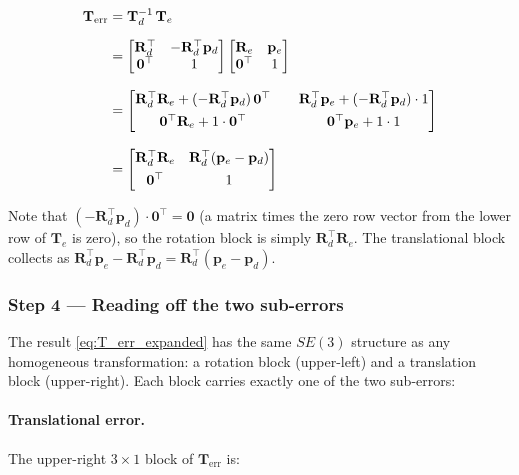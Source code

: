 \begin{align}
\mathbf{T}_{\mathrm{err}}
&= \mathbf{T}_d^{-1}\,\mathbf{T}_e \notag\\[6pt]
&=
\begin{bmatrix}
\mathbf{R}_d^\top & -\mathbf{R}_d^\top\mathbf{p}_d \\
\mathbf{0}^\top & 1
\end{bmatrix}
\begin{bmatrix}
\mathbf{R}_e & \mathbf{p}_e \\
\mathbf{0}^\top & 1
\end{bmatrix}
\notag\\[8pt]
&=
\begin{bmatrix}
\mathbf{R}_d^\top\mathbf{R}_e + (-\mathbf{R}_d^\top\mathbf{p}_d)\,\mathbf{0}^\top
&\quad
\mathbf{R}_d^\top\mathbf{p}_e + (-\mathbf{R}_d^\top\mathbf{p}_d)\cdot 1 \\[4pt]
\mathbf{0}^\top\mathbf{R}_e + 1\cdot\mathbf{0}^\top
&\quad
\mathbf{0}^\top\mathbf{p}_e + 1\cdot 1
\end{bmatrix}
\notag\\[8pt]
\label{eq:T_err_expanded}
&=
\begin{bmatrix}
\mathbf{R}_d^\top\mathbf{R}_e &
\mathbf{R}_d^\top(\mathbf{p}_e - \mathbf{p}_d) \\[4pt]
\mathbf{0}^\top & 1
\end{bmatrix}
\end{align}

Note that $(-\mathbf{R}_d^\top\mathbf{p}_d)\cdot\mathbf{0}^\top = \mathbf{0}$
(a matrix times the zero row vector from the lower row of $\mathbf{T}_e$
is zero), so the rotation block is simply $\mathbf{R}_d^\top\mathbf{R}_e$.
The translational block collects as $\mathbf{R}_d^\top\mathbf{p}_e
- \mathbf{R}_d^\top\mathbf{p}_d = \mathbf{R}_d^\top(\mathbf{p}_e-\mathbf{p}_d)$.

\subsubsection*{Step 4 --- Reading off the two sub-errors}

The result \cref{eq:T_err_expanded} has the same $SE(3)$ structure as
any homogeneous transformation: a rotation block (upper-left) and a
translation block (upper-right).
Each block carries exactly one of the two sub-errors:

\paragraph{Translational error.}
The upper-right $3\times1$ block of $\mathbf{T}_{\mathrm{err}}$ is:

